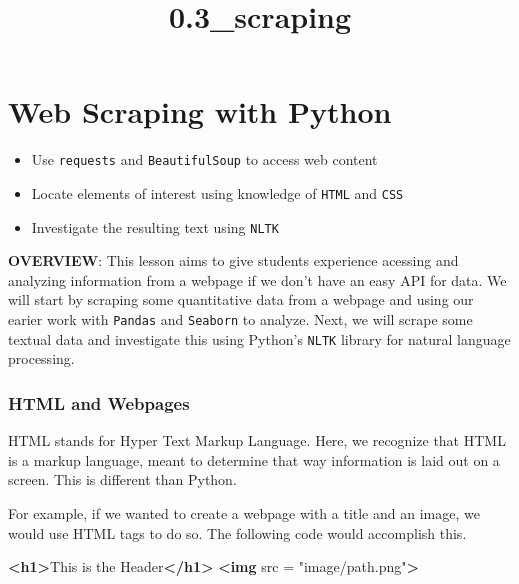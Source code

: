 \documentclass[11pt]{article}
\title{0.3\_scraping}
\providecommand{\tightlist}{%
      \setlength{\itemsep}{0pt}\setlength{\parskip}{0pt}}
\newenvironment{Shaded}{}{}
\newcommand{\KeywordTok}[1]{\textcolor[rgb]{0.00,0.44,0.13}{\textbf{{#1}}}}
\newcommand{\StringTok}[1]{\textcolor[rgb]{0.25,0.44,0.63}{{#1}}}
\newcommand{\OtherTok}[1]{\textcolor[rgb]{0.00,0.44,0.13}{{#1}}}
\newcommand{\NormalTok}[1]{{#1}}
\begin{document}
    
    
    \maketitle
    
    

    
    \section{Web Scraping with Python}\label{web-scraping-with-python}

\begin{itemize}
\tightlist
\item
  Use \texttt{requests} and \texttt{BeautifulSoup} to access web content
\item
  Locate elements of interest using knowledge of \texttt{HTML} and
  \texttt{CSS}
\item
  Investigate the resulting text using \texttt{NLTK}
\end{itemize}

\textbf{OVERVIEW}: This lesson aims to give students experience acessing
and analyzing information from a webpage if we don't have an easy API
for data. We will start by scraping some quantitative data from a
webpage and using our earier work with \texttt{Pandas} and
\texttt{Seaborn} to analyze. Next, we will scrape some textual data and
investigate this using Python's \texttt{NLTK} library for natural
language processing.

    \subsubsection{HTML and Webpages}\label{html-and-webpages}

HTML stands for Hyper Text Markup Language. Here, we recognize that HTML
is a markup language, meant to determine that way information is laid
out on a screen. This is different than Python.

For example, if we wanted to create a webpage with a title and an image,
we would use HTML tags to do so. The following code would accomplish
this.

\begin{Shaded}
\begin{Highlighting}[]
\KeywordTok{<h1>}\NormalTok{This is the Header}\KeywordTok{</h1>}
\KeywordTok{<img}\OtherTok{ src} \OtherTok{=} \StringTok{"image/path.png"}\KeywordTok{>}
\end{Highlighting}
\end{Shaded}
\end{document}
